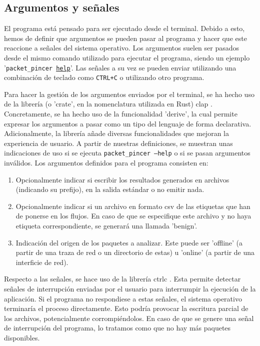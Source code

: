 \subsection{Argumentos y señales}

El programa está pensado para ser ejecutado desde el terminal. Debido a esto, hemos de definir que argumentos se pueden pasar al programa y hacer que este reaccione a señales del sistema operativo. Los argumentos suelen ser pasados desde el mismo comando utilizado para ejecutar el programa, siendo un ejemplo '\texttt{packet\_pincer \underline{help}}'. Las señales a su vez se pueden enviar utilizando una combinación de teclado como \texttt{CTRL+C} o utilizando otro programa.

Para hacer la gestión de los argumentos enviados por el terminal, se ha hecho uso de la librería (o 'crate', en la nomenclatura utilizada en Rust) clap \cite{Knapp_clap_2024}. Concretamente, se ha hecho uso de la funcionalidad 'derive', la cual permite expresar los argumentos a pasar como un tipo del lenguaje de forma declarativa. Adicionalmente, la librería añade diversas funcionalidades que mejoran la experiencia de usuario. A partir de nuestras definiciones, se muestran unas indicaciones de uso si se ejecuta \texttt{packet\_pincer --help} o si se pasan argumentos inválidos. Los argumentos definidos para el programa consisten en:

\begin{enumerate}
  \item Opcionalmente indicar si escribir los resultados generados en archivos (indicando su prefijo), en la salida estándar o no emitir nada.
  \item Opcionalmente indicar si un archivo en formato csv de las etiquetas que han de ponerse en los flujos. En caso de que se especifique este archivo y no haya etiqueta correspondiente, se generará una llamada 'benign'.
  \item Indicación del origen de los paquetes a analizar. Este puede ser 'offline' (a partir de una traza de red o un directorio de estas) u 'online' (a partir de una interficie de red).
\end{enumerate}

Respecto a las señales, se hace uso de la librería ctrlc \cite{controlc}. Esta permite detectar señales de interrupción enviadas por el usuario para interrumpir la ejecución de la aplicación. Si el programa no respondiese a estas señales, el sistema operativo terminaría el proceso directamente. Esto podría provocar la escritura parcial de los archivos, potencialmente corrompiéndolos. En caso de que se genere una señal de interrupción del programa, lo tratamos como que no hay más paquetes disponibles.

